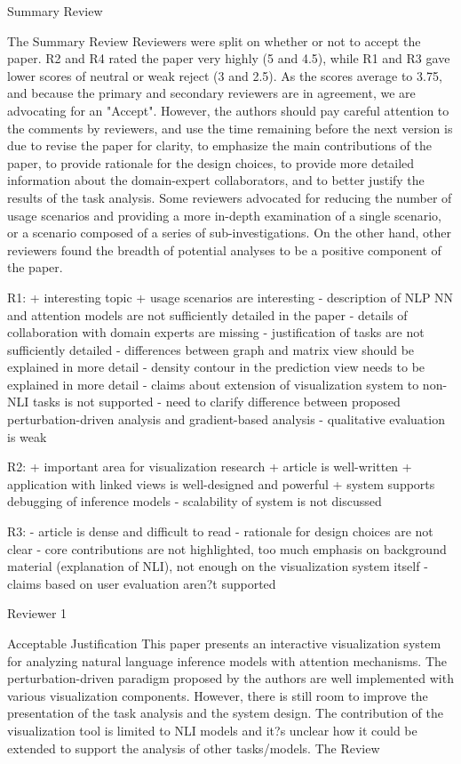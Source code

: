 Summary Review

The Summary Review
Reviewers were split on whether or not to accept the paper. R2 and R4 rated the paper very highly (5 and 4.5), while R1 and R3 gave lower scores of neutral or weak reject (3 and 2.5). As the scores average to 3.75, and because the primary and secondary reviewers are in agreement, we are advocating for an "Accept". However, the authors should pay careful attention to the comments by reviewers, and use the time remaining before the next version is due to revise the paper for clarity, to emphasize the main contributions of the paper, to provide rationale for the design choices, to provide more detailed information about the domain-expert collaborators, and to better justify the results of the task analysis. Some reviewers advocated for reducing the number of usage scenarios and providing a more in-depth examination of a single scenario, or a scenario composed of a series of sub-investigations. On the other hand, other reviewers found the breadth of potential analyses to be a positive component of the paper.

R1:
+ interesting topic
+ usage scenarios are interesting
- description of NLP NN and attention models are not sufficiently detailed in the paper
- details of collaboration with domain experts are missing
- justification of tasks are not sufficiently detailed
- differences between graph and matrix view should be explained in more detail
- density contour in the prediction view needs to be explained in more detail
- claims about extension of visualization system to non-NLI tasks is not supported
- need to clarify difference between proposed perturbation-driven analysis and gradient-based analysis
- qualitative evaluation is weak

R2:
+ important area for visualization research
+ article is well-written
+ application with linked views is well-designed and powerful
+ system supports debugging of inference models
- scalability of system is not discussed

R3:
- article is dense and difficult to read
- rationale for design choices are not clear
- core contributions are not highlighted, too much emphasis on background material (explanation of NLI), not enough on the visualization system itself
- claims based on user evaluation aren?t supported

Reviewer 1

Acceptable
Justification
This paper presents an interactive visualization system for analyzing natural language inference models with attention mechanisms. The perturbation-driven paradigm proposed by the authors are well implemented with various visualization components. However, there is still room to improve the presentation of the task analysis and the system design. The contribution of the visualization tool is limited to NLI models and it?s unclear how it could be extended to support the analysis of other tasks/models.
The Review


